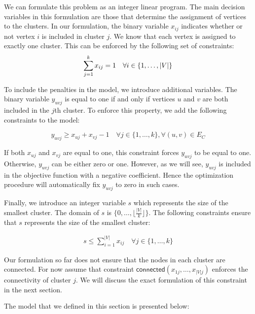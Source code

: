 \documentclass[conference,compsoc]{IEEEtran}
\newcommand{\NDB}[1]{\todo[bordercolor=mhue,linecolor=mhue,color=mhue!40]{Behrouz: #1}}
\begin{document}
We can formulate this problem as an integer linear program. The main
decision variables in this formulation are those that determine the
assignment of vertices to the clusters. In our formulation, the binary
variable $x_{ij}$ indicates whether or not vertex $i$ is included in
cluster $j$. We know that each vertex is assigned to exactly one
cluster. This can be enforced by the following set of constraints:
\NDB{Avoid $|V|$ throughout}
\begin{equation}
\sum_{j=1}^k x_{ij} = 1 \quad \forall i \in \{1, \ldots, |V|\} \label{cons:assign}\\
\end{equation}

To include the penalties in the model, we introduce additional
variables. The binary variable $y_{uvj}$ is equal to one if and only if
vertices $u$ and $v$ are both included in the $j$th cluster. To enforce
this property, we add the following constraints to the model:

\begin{equation}
y_{uvj} \geq x_{uj} + x_{vj} -1 \quad \forall j \in \{1, \ldots, k\}, \forall (u, v) \in E_{C}
\end{equation}

If both $x_{uj}$ and $x_{vj}$ are equal to one, this constraint forces
$y_{uvj}$ to be equal to one. Otherwise, $y_{uvj}$ can be either zero or
one. However, as we will see, $y_{uvj}$ is included in the objective
function with a negative coefficient. Hence the optimization procedure
will automatically fix $y_{uvj}$ to zero in such cases.

Finally, we introduce an integer variable $s$ which represents the size
of the smallest cluster. The domain of $s$ is
$\{0, \ldots, \lfloor \frac{|V|}{k} \rfloor \}$. The following constraints
ensure that $s$ represents the size of the smallest cluster:

\begin{align}
s \leq \sum_{i=1}^{|V|} x_{ij} \quad \forall j \in \{1, \ldots, k\}
\end{align}

Our formulation so far does not ensure that the nodes in each cluster
are connected. For now assume that constraint
$\mathsf{connected}(x_{1j}, \ldots, x_{|V|j})$ enforces the connectivity of
cluster $j$. We will discuss the exact formulation of this constraint in
the next section. 

The model that we defined in this section is presented
below:
\end{document}
